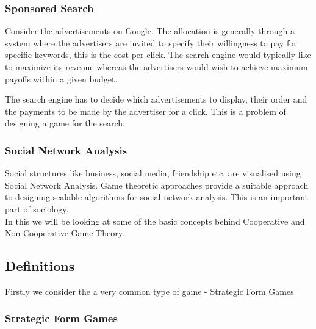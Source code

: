 \documentclass{article}
\theoremstyle{definition}
\begin{document}
\subsubsection*{Sponsored Search}
Consider the advertisements on Google. The allocation is generally through a system where the advertisers are invited to specify their willingness to pay for specific keywords, this is the cost per click. The search engine would typically like to maximize its revenue whereas the advertisers would wish to achieve maximum payoffs within a given budget.

The search engine has to decide which advertisements to display, their order and the payments to be made by the advertiser for a click. This is a problem of designing a game for the search.
\subsubsection*{Social Network Analysis}
Social structures like business, social media, friendship etc. are visualised using Social Network Analysis. Game theoretic approaches provide a suitable approach to designing scalable algorithms for social network analysis. This is an important part of sociology.\\

In this we will be looking at some of the basic concepts behind Cooperative and Non-Cooperative Game Theory.
\subsection{Definitions}
Firstly we consider the a very common type of game - Strategic Form Games
\subsubsection{Strategic Form Games}
\end{document}
